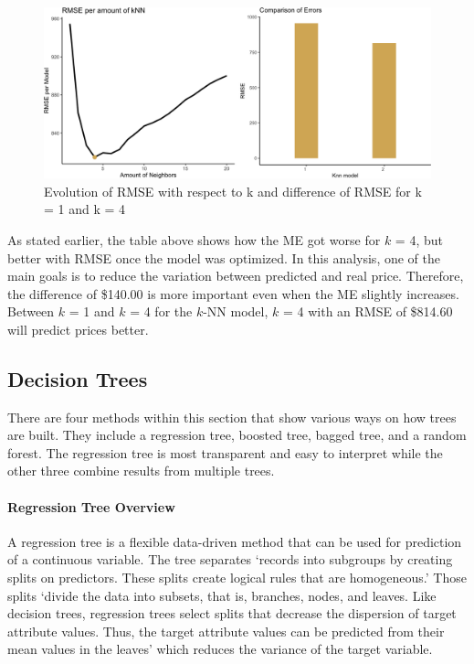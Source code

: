 \documentclass[
  paper=a4,
  ,captions=tableheading
]{scrartcl}
\begin{document}
\begin{figure}[H]

{\centering \includegraphics[width=0.5\linewidth,]{Diamonds_PDF_files/figure-latex/knn double plot-1} 

}

\caption{Evolution of RMSE with respect to k and difference of RMSE for k = 1 and k = 4}\label{fig:knn double plot}
\end{figure}

As stated earlier, the table above shows how the ME got worse for \(k\)
= 4, but better with RMSE once the model was optimized. In this
analysis, one of the main goals is to reduce the variation between
predicted and real price. Therefore, the difference of \$140.00 is more
important even when the ME slightly increases. Between \(k\) = 1 and
\(k\) = 4 for the \(k\)-NN model, \(k\) = 4 with an RMSE of \$814.60
will predict prices better.

\hypertarget{decision-trees}{%
\subsection{Decision Trees}\label{decision-trees}}

There are four methods within this section that show various ways on how
trees are built. They include a regression tree, boosted tree, bagged
tree, and a random forest. The regression tree is most transparent and
easy to interpret while the other three combine results from multiple
trees.

\hypertarget{regression-tree-overview}{%
\paragraph{Regression Tree Overview}\label{regression-tree-overview}}

A regression tree is a flexible data-driven method that can be used for
prediction of a continuous variable. The tree separates `records into
subgroups by creating splits on predictors. These splits create logical
rules that are homogeneous.' Those splits `divide the data into subsets,
that is, branches, nodes, and leaves. Like decision trees, regression
trees select splits that decrease the dispersion of target attribute
values. Thus, the target attribute values can be predicted from their
mean values in the leaves' which reduces the variance of the target
variable.
\end{document}
